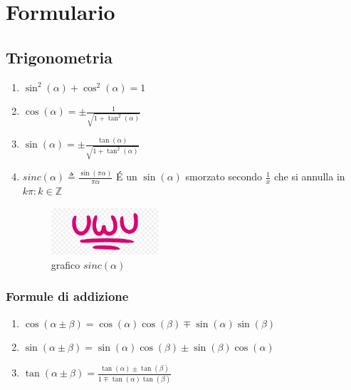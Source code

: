 \section{Formulario}
    \subsection{Trigonometria}\label{Trigonometria}
        \begin{enumerate}
            \item {
                $\sin^2(\alpha) + \cos^2(\alpha) = 1$
            }
            \item {
                $\cos(\alpha)=\pm\frac{1}{\sqrt{1+\tan^2(\alpha)}}$
            }
            \item {
                $\sin(\alpha)=\pm\frac{\tan(\alpha)}{\sqrt{1+\tan^2(\alpha)}}$
            }
            \item {
                $sinc(\alpha)\triangleq\frac{\sin(\pi\alpha)}{\pi\alpha}$ 
                É un $\sin(\alpha)$ smorzato secondo $\frac{1}{x}$ che si annulla in $k\pi: k\in\mathbb{Z}$
                \begin{figure}[htp]
                    \centering
                    \includegraphics[width=4cm]{media/uwu.png}
                    \caption{grafico $sinc(\alpha)$}
                    \label{fig:grafico sinc}
                \end{figure}
            }
        \end{enumerate}
        \subsubsection{Formule di addizione}\label{Trigonometria_Addizione}
            \begin{enumerate}
                \item {
                    $\cos(\alpha \pm \beta) = \cos(\alpha)\cos(\beta) \mp \sin(\alpha)\sin(\beta)$
                }
                \item {
                    $\sin(\alpha \pm \beta) = \sin(\alpha)\cos(\beta) \pm \sin(\beta)\cos(\alpha)$
                }
                \item {
                    $\tan(\alpha \pm \beta) = \frac{\tan(\alpha) \pm \tan(\beta)}{1 \mp \tan(\alpha)\tan(\beta)} $
                }
            \end{enumerate}
